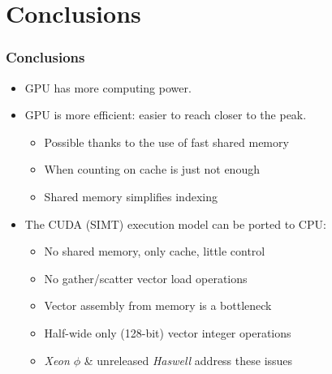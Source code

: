 \documentclass{beamer}
\begin{document}

\section{Conclusions}

\begin{frame}
  \frametitle{Conclusions}
  \begin{itemize}
    \item GPU has more computing power.
    \item GPU is more efficient: easier to reach closer to the peak.
    \begin{itemize}
      \item Possible thanks to the use of fast shared memory
      \item When counting on cache is just not enough
      \item Shared memory simplifies indexing
    \end{itemize}
    \item The CUDA (SIMT) execution model can be ported to CPU:
    \begin{itemize}
      \item No shared memory, only cache, little control
      \item No gather/scatter vector load operations
      \item Vector assembly from memory is a bottleneck
      \item Half-wide only (128-bit) vector integer operations
      \vspace{1em}
      \item \emph{Xeon $\phi$} \& unreleased \emph{Haswell} address these issues
    \end{itemize}
  \end{itemize}
\end{frame}
\end{document}
